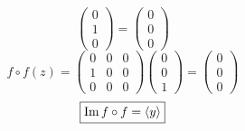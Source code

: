 \documentclass[../practica.root.tex]{subfiles}
\begin{document}
\begin{enumerate}
\[\begin{pmatrix}
                  0 \\ 1 \\ 0
              \end{pmatrix} = \begin{pmatrix}
                  0 \\ 0 \\ 0
              \end{pmatrix}
          \] \[
              f \circ f(z) = \begin{pmatrix}
                  0 & 0 & 0 \\
                  1 & 0 & 0 \\
                  0 & 0 & 0
              \end{pmatrix}\begin{pmatrix}
                  0 \\ 0 \\ 1
              \end{pmatrix} = \begin{pmatrix}
                  0 \\ 0 \\ 0
              \end{pmatrix}
          \] \[
              \boxed{\operatorname{Im} f \circ f = \langle y \rangle}
          \]


\end{enumerate}
\end{document}
